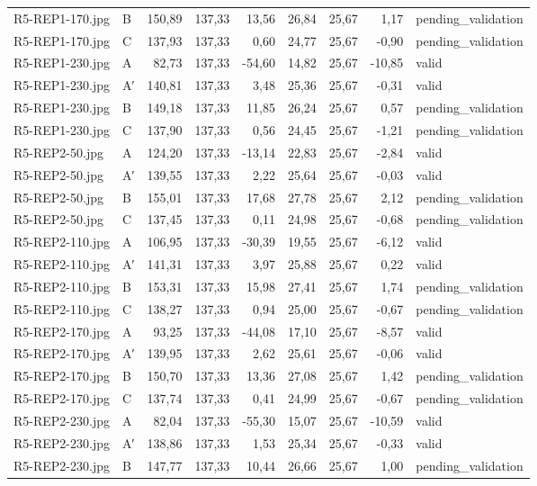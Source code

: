 \begin{scriptsize}
\begin{longtable}{@{}llrrrrrrl@{}}
R5-REP1-170.jpg & B & 150,89 & 137,33 & 13,56 & 26,84 & 25,67 & 1,17 & pending\_validation \\
R5-REP1-170.jpg & C & 137,93 & 137,33 & 0,60 & 24,77 & 25,67 & -0,90 & pending\_validation \\
R5-REP1-230.jpg & A & 82,73 & 137,33 & -54,60 & 14,82 & 25,67 & -10,85 & valid \\
R5-REP1-230.jpg & A′ & 140,81 & 137,33 & 3,48 & 25,36 & 25,67 & -0,31 & valid \\
R5-REP1-230.jpg & B & 149,18 & 137,33 & 11,85 & 26,24 & 25,67 & 0,57 & pending\_validation \\
R5-REP1-230.jpg & C & 137,90 & 137,33 & 0,56 & 24,45 & 25,67 & -1,21 & pending\_validation \\
R5-REP2-50.jpg & A & 124,20 & 137,33 & -13,14 & 22,83 & 25,67 & -2,84 & valid \\
R5-REP2-50.jpg & A′ & 139,55 & 137,33 & 2,22 & 25,64 & 25,67 & -0,03 & valid \\
R5-REP2-50.jpg & B & 155,01 & 137,33 & 17,68 & 27,78 & 25,67 & 2,12 & pending\_validation \\
R5-REP2-50.jpg & C & 137,45 & 137,33 & 0,11 & 24,98 & 25,67 & -0,68 & pending\_validation \\
R5-REP2-110.jpg & A & 106,95 & 137,33 & -30,39 & 19,55 & 25,67 & -6,12 & valid \\
R5-REP2-110.jpg & A′ & 141,31 & 137,33 & 3,97 & 25,88 & 25,67 & 0,22 & valid \\
R5-REP2-110.jpg & B & 153,31 & 137,33 & 15,98 & 27,41 & 25,67 & 1,74 & pending\_validation \\
R5-REP2-110.jpg & C & 138,27 & 137,33 & 0,94 & 25,00 & 25,67 & -0,67 & pending\_validation \\
R5-REP2-170.jpg & A & 93,25 & 137,33 & -44,08 & 17,10 & 25,67 & -8,57 & valid \\
R5-REP2-170.jpg & A′ & 139,95 & 137,33 & 2,62 & 25,61 & 25,67 & -0,06 & valid \\
R5-REP2-170.jpg & B & 150,70 & 137,33 & 13,36 & 27,08 & 25,67 & 1,42 & pending\_validation \\
R5-REP2-170.jpg & C & 137,74 & 137,33 & 0,41 & 24,99 & 25,67 & -0,67 & pending\_validation \\
R5-REP2-230.jpg & A & 82,04 & 137,33 & -55,30 & 15,07 & 25,67 & -10,59 & valid \\
R5-REP2-230.jpg & A′ & 138,86 & 137,33 & 1,53 & 25,34 & 25,67 & -0,33 & valid \\
R5-REP2-230.jpg & B & 147,77 & 137,33 & 10,44 & 26,66 & 25,67 & 1,00 & pending\_validation \\

\end{longtable}
\end{scriptsize}
